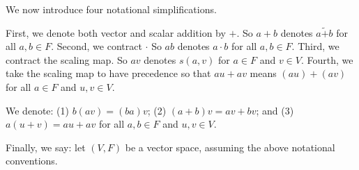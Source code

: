 We now introduce four notational
simplifications.

First, we denote both vector
and scalar addition by $+$.
So $a + b$ denotes $a \tilde{+} b$
for all $a, b \in F$.
Second,
we contract $\cdot$
So $ab$ denotes $a \cdot b$
for all $a, b \in F$.
Third, we
contract the scaling map.
So $av$ denotes $s(a, v)$
for $a \in F$ and $v \in V$.
Fourth,
we take the scaling
map to have precedence so that
$au + av$ means $(au) + (av)$
for all $a \in F$ and $u,v \in V$.

We denote:
(1)
$b(av) = (ba)v$;
(2)
$(a+b)v = av + bv$;
and (3)
$a(u + v) = au + av$
for all
$a,b \in F$ and $u, v \in V$.

Finally, we say: let $(V, F)$
be a vector space, assuming the
above notational conventions.
\strats
